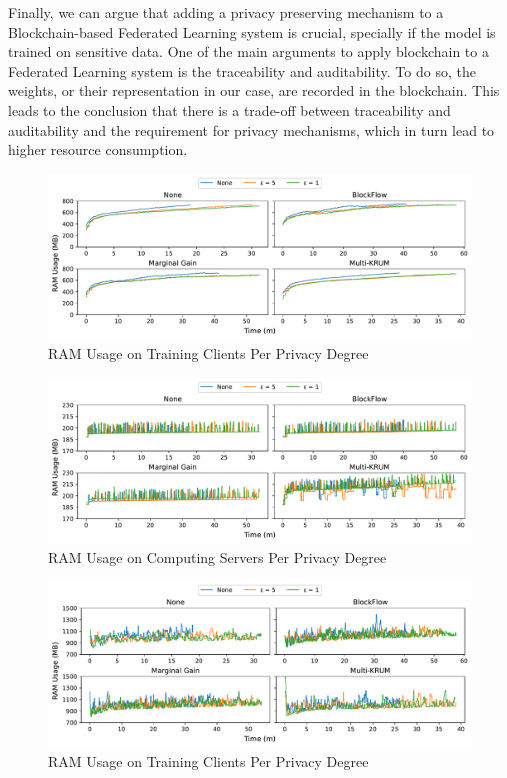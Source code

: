 Finally, we can argue that adding a privacy preserving mechanism to a Blockchain-based Federated Learning system is crucial, specially if the model is trained on sensitive data. One of the main arguments to apply blockchain to a Federated Learning system is the traceability and auditability. To do so, the weights, or their representation in our case, are recorded in the blockchain. This leads to the conclusion that there is a trade-off between traceability and auditability and the requirement for privacy mechanisms, which in turn lead to higher resource consumption.

\clearpage

\begin{figure}[!h]
    \centering
    \includegraphics[width=\textwidth]{graphics/privacy/ram_client.pdf}
    \caption{RAM Usage on Training Clients Per Privacy Degree}
    \label{fig:ram_privacy_clients}
\end{figure}

\vfill

\begin{figure}[!h]
    \centering
    \includegraphics[width=\textwidth]{graphics/privacy/ram_server.pdf}
    \caption{RAM Usage on Computing Servers Per Privacy Degree}
    \label{fig:ram_privacy_servers}
\end{figure}

\vfill

\begin{figure}[!h]
    \centering
    \includegraphics[width=\textwidth]{graphics/privacy/ram_miner.pdf}
    \caption{RAM Usage on Training Clients Per Privacy Degree}
    \label{fig:ram_privacy_miners}
\end{figure}


